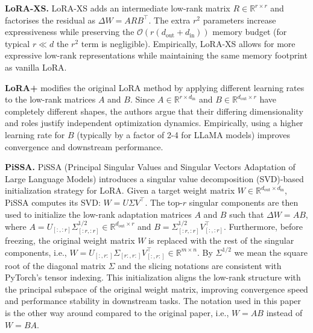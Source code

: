 \documentclass[a4paper,10pt,twocolumn,english]{article}
\begin{document}
\noindent\textbf{LoRA-XS.} LoRA-XS \cite{balazy2024loraxslowrankadaptationextremely} adds an intermediate low-rank matrix $R\!\in\!\mathbb{R}^{r\times r}$ and factorises the residual as $\Delta W = A R B^{\top}$.  The extra $r^{2}$ parameters increase expressiveness while preserving the $\mathcal{O}(r(d_{\text{out}}+d_{\text{in}}))$ memory budget (for typical $r\!\ll\!d$ the $r^{2}$ term is negligible). Empirically, LoRA-XS allows for more expressive low-rank representations while maintaining the same memory footprint as vanilla LoRA.

\noindent\textbf{LoRA+}\cite{hayou2024loraefficientlowrank} modifies the original LoRA method by applying different learning rates to the low-rank matrices $A$ and $B$. Since $A\!\in\!\mathbb{R}^{r \times d_{\text{in}}}$ and $B\!\in\!\mathbb{R}^{d_\text{out} \times r}$ have completely different shapes, the authors argue that their differing dimensionality and roles justify independent optimization dynamics. Empirically, using a higher learning rate for $B$ (typically by a factor of 2-4 for LLaMA models) improves convergence and downstream performance.

\noindent\textbf{PiSSA.} PiSSA\cite{meng2025pissaprincipalsingularvalues} (Principal Singular Values and Singular Vectors Adaptation of Large Language Models) introduces a singular value decomposition (SVD)-based initialization strategy for LoRA. Given a target weight matrix \( W \in \mathbb{R}^{d_{\text{out}} \times d_{\text{in}}} \), PiSSA computes its SVD: \( W = U \Sigma V^\top \). The top-\( r \) singular components are then used to initialize the low-rank adaptation matrices \( A \) and \( B \) such that \( \Delta W = A B \), where \( A = U_{[:, :r]} \Sigma^{1 / 2}_{[:r, :r]} \in \mathbb{R}^{d_{\text{out}} \times r} \) and \( B = \Sigma^{1 / 2}_{[:r, :r]} V^\top_{[:, :r]} \). Furthermore, before freezing, the original weight matrix $W$ is replaced with the rest of the singular components, i.e., \( W = U_{[:, r:]} \Sigma_{[r:, r:]} V^\top_{[:, r:]} \in \mathbb{R}^{m \times n} \). By $\Sigma^{1 / 2}$ we mean the square root of the diagonal matrix $\Sigma$ and the slicing notations are consistent with PyTorch's tensor indexing. This initialization aligns the low-rank structure with the principal subspace of the original weight matrix, improving convergence speed and performance stability in downstream tasks. The notation used in this paper is the other way around compared to the original paper, i.e., $W = A B$ instead of $W = B A$.


\end{document}
